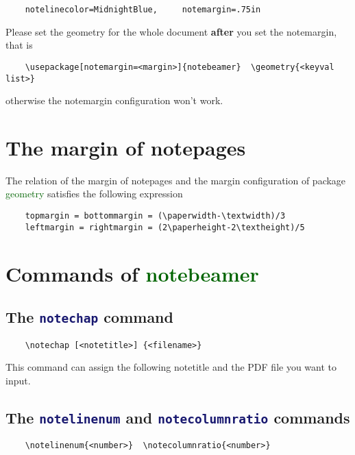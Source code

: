 \documentclass[11pt,svgnames]{article}
\def\pkg#1{\textcolor{DarkGreen}{\textsf{#1}}}
\def\cmd#1{\textcolor{MidnightBlue}{\texttt{\string#1}}}
\begin{document}
\begin{verbatim}
    notelinecolor=MidnightBlue,     notemargin=.75in
\end{verbatim}

Please set the geometry for the whole document \textbf{after} you set the notemargin, that is

\begin{verbatim}
    \usepackage[notemargin=<margin>]{notebeamer}  \geometry{<keyval list>}
\end{verbatim}

otherwise the notemargin configuration won't work.

\section{The margin of notepages}

The relation of the margin of notepages and the margin configuration of package \pkg{geometry} satisfies the following expression

\begin{verbatim}
    topmargin = bottommargin = (\paperwidth-\textwidth)/3
    leftmargin = rightmargin = (2\paperheight-2\textheight)/5
\end{verbatim}

\section{Commands of \pkg{notebeamer}}

\subsection{The \cmd{notechap} command}

\begin{verbatim}
    \notechap [<notetitle>] {<filename>}
\end{verbatim}

This command can assign the following notetitle and the PDF file you want to input.

\subsection{The \cmd{notelinenum} and \cmd{notecolumnratio} commands}

\begin{verbatim}
    \notelinenum{<number>}  \notecolumnratio{<number>}
\end{verbatim}
\end{document}

